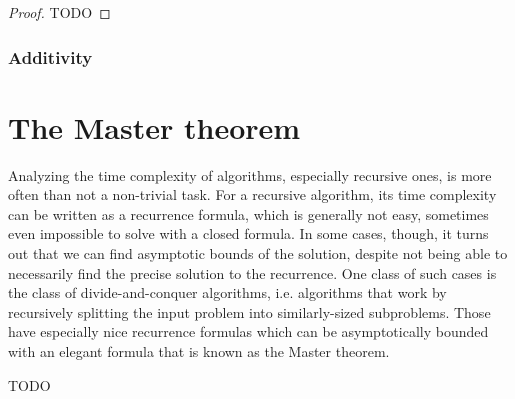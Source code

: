 \begin{proof}
    \leanok
    TODO
\end{proof}


\subsubsection{Additivity}


\section{The Master theorem}

Analyzing the time complexity of algorithms, especially recursive ones, is more often 
than not a non-trivial task. For a recursive algorithm, its time complexity can be 
written as a recurrence formula, which is generally not easy, sometimes even impossible 
to solve with a closed formula. In some cases, though, it turns out that we can find 
asymptotic bounds of the solution, despite not being able to necessarily find the 
precise solution to the recurrence. One class of such cases is the class of 
divide-and-conquer algorithms, i.e. algorithms that work by recursively splitting the input 
problem into similarly-sized subproblems. Those have especially nice recurrence formulas 
which can be asymptotically bounded with an elegant formula that is known as the Master theorem.

\begin{theorem}
TODO
\end{theorem}
